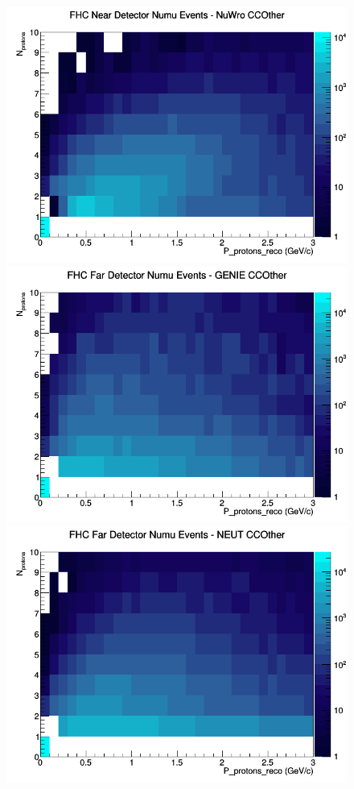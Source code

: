 \begin{figure}[h]
\includegraphics[width=\linewidth]{eff_N_P/FGT/protons/CCOther_FHC_ND_numu_N_P_NuWro.png}
\endminipage
\newline
{}
\includegraphics[width=\linewidth]{eff_N_P/FGT/protons/CCOther_FHC_FD_numu_N_P_GENIE.png}
\endminipage
{}
\includegraphics[width=\linewidth]{eff_N_P/FGT/protons/CCOther_FHC_FD_numu_N_P_NEUT.png}

\end{figure}
